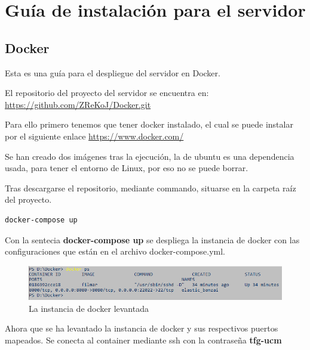 
\cleardoublepage

\chapter{Guía de instalación para el servidor}
\label{app:guia_instalacion}

\section{Docker}
\label{app:docker}
Esta es una guía para el despliegue del servidor en Docker.

El repositorio del proyecto del servidor se encuentra en:
\url{https://github.com/ZReKoJ/Docker.git}

Para ello primero tenemos que tener docker instalado, el cual 
se puede instalar por el siguiente enlace \url{https://www.docker.com/}

Se han creado dos imágenes tras la ejecución, la de ubuntu es una dependencia usada, para tener el entorno de Linux, por eso no se puede borrar.

Tras descargarse el repositorio, mediante commando, situarse en la carpeta raíz del proyecto.

\begin{lstlisting}[language=bash, caption=Levantamiento de la instancia de docker]
    docker-compose up
\end{lstlisting}

Con la sentecia \textbf{docker-compose up} se despliega la instancia de docker con las configuraciones 
que están en el archivo docker-compose.yml.

\begin{figure}[H]
    \centering
    \includegraphics[width=6in]{figures/appendix-A/list-docker-containers.png}
    \caption{La instancia de docker levantada}
\end{figure}

Ahora que se ha levantado la instancia de docker y sus respectivos puertos mapeados.
Se conecta al container mediante ssh con la contraseña \textbf{tfg-ucm}

